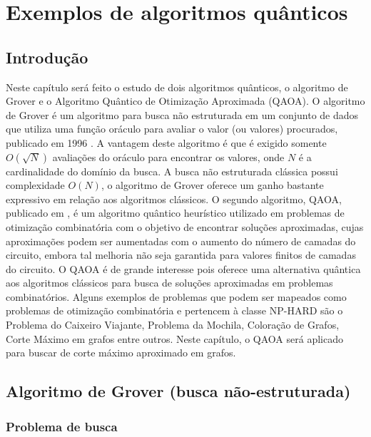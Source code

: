 
\chapter[Exemplos de algoritmos quânticos]{Exemplos de algoritmos quânticos}
\label{chap:algoq}

\section{Introdução}

Neste capítulo será feito o estudo de dois algoritmos quânticos, o algoritmo de Grover e o Algoritmo Quântico de Otimização Aproximada (QAOA). O algoritmo de Grover é um algoritmo para busca não estruturada em um conjunto de dados que utiliza uma função oráculo para avaliar o valor (ou valores) procurados, publicado em 1996 \cite{groveralgo}. A vantagem deste algoritmo é que é exigido somente $O(\sqrt{N})$ avaliações do oráculo para encontrar os valores, onde $N$ é a cardinalidade do domínio da busca. A busca não estruturada clássica possui complexidade $O(N)$, o algoritmo de Grover oferece um ganho bastante expressivo em relação aos algoritmos clássicos. O segundo algoritmo, QAOA, publicado em \cite{farhi2014quantumapproximateoptimizationalgorithm}, é um algoritmo quântico heurístico utilizado em problemas de otimização combinatória com o objetivo de encontrar soluções aproximadas, cujas aproximações podem ser aumentadas com o aumento do número de camadas do circuito, embora tal melhoria não seja garantida para valores finitos de camadas do circuito. O QAOA é de grande interesse pois oferece uma alternativa quântica aos algoritmos clássicos para busca de soluções aproximadas em problemas combinatórios. Alguns exemplos de problemas que podem ser mapeados como problemas de otimização combinatória e pertencem à classe \textsf{NP-HARD} são o Problema do Caixeiro Viajante, Problema da Mochila, Coloração de Grafos, Corte Máximo em grafos entre outros. Neste capítulo, o QAOA será aplicado para buscar de corte máximo aproximado em grafos.

\section{Algoritmo de Grover (busca não-estruturada)}

\subsection{Problema de busca}

